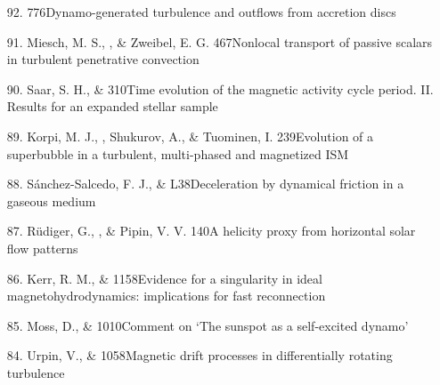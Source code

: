 \begin{itemize}
\item[92.]
\Brandenburg{}
{776}{Dynamo-generated turbulence and outflows from accretion discs}

\item[91.]
Miesch, M. S., \Brandenburg, \& Zweibel, E. G.
{467}{Nonlocal transport of passive scalars in turbulent penetrative convection}

\item[90.]
Saar, S. H., \& \Brandenburg{}
{310}{Time evolution of the magnetic activity cycle period. II.
Results for an expanded stellar sample}

\item[89.]
Korpi, M. J., \Brandenburg, Shukurov, A., \& Tuominen, I.
{239}{Evolution of a superbubble in a turbulent, multi-phased and
magnetized ISM}

\item[88.]
S\'{a}nchez-Salcedo, F. J., \& \Brandenburg{}
{L38}{Deceleration by dynamical friction in a gaseous medium}

\item[87.]
R\"udiger, G., \Brandenburg, \& Pipin, V. V.
{140}{A helicity proxy from horizontal solar flow patterns}

\item[86.]
Kerr, R. M., \& \Brandenburg{}
{1158}{Evidence for a singularity in ideal magnetohydrodynamics:
implications for fast reconnection}

\item[85.]
Moss, D., \& \Brandenburg{}
{1010}{Comment on `The sunspot as a self-excited dynamo'}

\item[84.]
Urpin, V., \& \Brandenburg{}
{1058}{Magnetic drift processes in differentially rotating turbulence}


\end{itemize}
